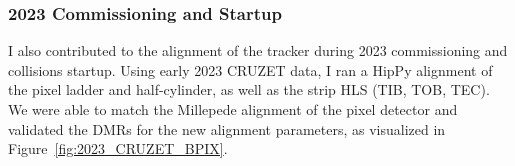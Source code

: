 



\subsubsection{2023 Commissioning and Startup}

I also contributed to the alignment of the tracker during 2023 commissioning and collisions startup. Using early 2023 CRUZET data, I ran a HipPy alignment of the pixel ladder and half-cylinder, as well as the strip HLS (TIB, TOB, TEC). We were able to match the Millepede alignment of the pixel detector and validated the DMRs for the new alignment parameters, as visualized in Figure~\ref{fig:2023_CRUZET_BPIX}. 


